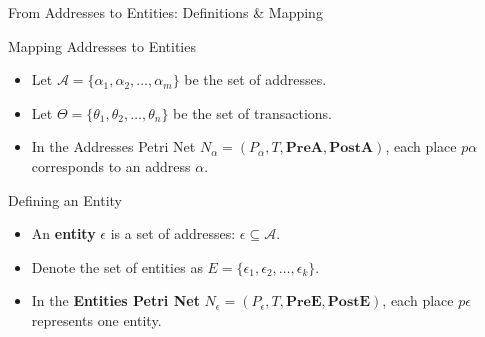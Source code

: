 \documentclass{beamer}
\begin{document}
\begin{frame}{From Addresses to Entities: Definitions \& Mapping}
    \footnotesize
    \begin{block}{Mapping Addresses to Entities}
        \begin{itemize}
            \item Let \(\mathcal{A}=\{\alpha_1, \alpha_2, \dots, \alpha_m\}\) be the set of addresses.
            \item Let \(\Theta=\{\theta_1, \theta_2, \dots, \theta_n\}\) be the set of transactions.
            \item In the Addresses Petri Net \(N_\alpha=(P_\alpha, T, \mathbf{PreA}, \mathbf{PostA})\), each place \(p\alpha\) corresponds to an address \(\alpha\).
        \end{itemize}
    \end{block}

    \begin{block}{Defining an Entity}
        \begin{itemize}
            \item An \textbf{entity} \(\epsilon\) is a set of addresses: \(\epsilon\subseteq \mathcal{A}\).
            \item Denote the set of entities as \(E=\{\epsilon_1, \epsilon_2, \dots, \epsilon_k\}\).
            \item In the \textbf{Entities Petri Net} \(N_{\epsilon}=(P_{\epsilon}, T, \mathbf{PreE}, \mathbf{PostE})\), each place \(p\epsilon\) represents one entity.
        \end{itemize}
    \end{block}

\end{frame}
\end{document}
